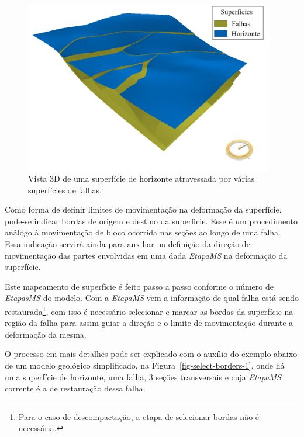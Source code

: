 \begin{figure} [H]
  \begin{center}
    \includegraphics[width=310pt]{images/fig-surfaces-horizon-faults}
    \caption{Vista 3D de uma superfície de horizonte atravessada por várias superfícies de falhas.}\label{fig-surfaces-horizon-faults}
  \end{center}
\end{figure}

Como forma de definir limites de movimentação na deformação da superfície, pode-se indicar bordas de origem e destino da superficie. Esse é um procedimento análogo à movimentação de bloco ocorrida nas seções ao longo de uma falha. Essa indicação servirá ainda para auxiliar na definição da direção de movimentação das partes envolvidas em uma dada \textit{EtapaMS} na deformação da superfície.

Este mapeamento de superfície é feito passo a passo conforme o número de \textit{EtapasMS} do modelo. Com a \textit{EtapaMS} vem a informação de qual falha está sendo restaurada\footnote{Para o caso de descompactação, a etapa de selecionar bordas não é necessária.}, com isso é necessário selecionar e marcar as bordas da superfície na região da falha para assim guiar a direção e o limite de movimentação durante a deformação da mesma.

O processo em mais detalhes pode ser explicado com o auxílio do exemplo abaixo de um modelo geológico simplificado, na Figura~\ref{fig-select-borders-1}, onde há uma superfície de horizonte, uma falha, 3 seções transversais e cuja \textit{EtapaMS} corrente é a de restauração dessa falha.

